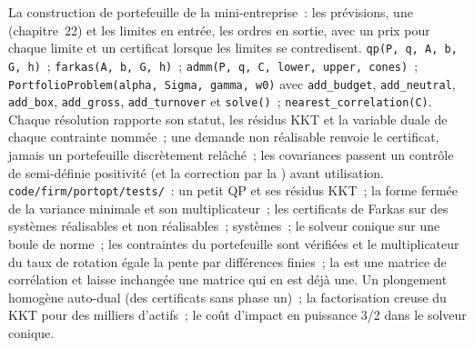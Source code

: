 \begin{build}
 La construction de portefeuille de la mini-entreprise~: les prévisions, une  (chapitre~22) et les limites en entrée, les ordres en sortie, avec un prix pour chaque limite et un certificat lorsque les limites
se contredisent.
 \texttt{qp(P, q, A, b, G, h)}~; \texttt{farkas(A, b, G, h)}~; \texttt{admm(P, q, C, lower, upper, cones)}~; \texttt{PortfolioProblem(alpha, Sigma, gamma, w0)} avec
\texttt{add\_budget}, \texttt{add\_neutral}, \texttt{add\_box}, \texttt{add\_gross}, \texttt{add\_turnover} et \texttt{solve()}~; \texttt{nearest\_correlation(C)}.
 Chaque résolution rapporte son statut, les résidus KKT et la variable duale de chaque contrainte nommée~; une demande non réalisable renvoie le certificat, jamais un portefeuille discrètement relâché~;
les covariances passent un contrôle de semi-définie positivité (et la correction par la ) avant utilisation.
 \texttt{code/firm/portopt/tests/}~: un petit QP et ses résidus KKT~; la forme fermée de la variance minimale et son multiplicateur~; les certificats de Farkas sur des systèmes réalisables et non réalisables~;
systèmes~; le solveur conique sur une boule de norme~; les contraintes du portefeuille sont vérifiées et le multiplicateur du taux de rotation égale la pente par différences finies~; la  est une matrice de corrélation et
laisse inchangée une matrice qui en est déjà une.
 Un plongement homogène auto-dual (des certificats sans phase un)~; la factorisation creuse du KKT pour des milliers d'actifs~; le coût d'impact en puissance 3/2 dans le solveur conique.
\end{build}

